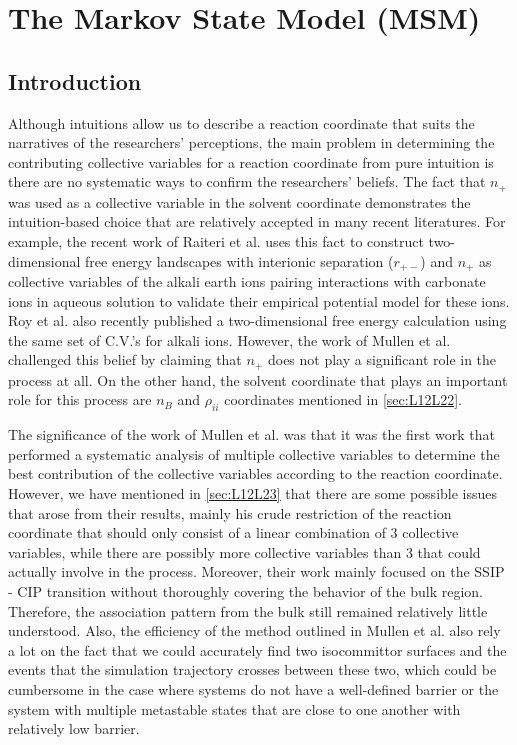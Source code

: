 \chapter{The Markov State Model (MSM)}

\section{Introduction}

\begin{spacing}{2.0}

    Although intuitions allow us to describe a reaction coordinate that suits the narratives of the researchers' perceptions, the main problem in 
    determining the contributing collective variables for a reaction coordinate from pure intuition is there are no systematic ways to confirm the 
    researchers' beliefs. The fact that $n_+$ was used as a collective variable in the solvent coordinate demonstrates the intuition-based choice 
    that are relatively accepted in many recent literatures. For example, the recent work of Raiteri et al. uses this fact to construct 
    two-dimensional free energy landscapes with interionic separation ($r_{+-}$) and $n_+$ as collective variables of the alkali earth ions pairing 
    interactions with carbonate ions in aqueous solution to validate their empirical potential model for these ions. \cite{P-JPhysChemC-2015-v43-Raiteri} 
    Roy et al. also recently published a two-dimensional free energy calculation using the same set of C.V.'s for alkali ions. 
    \cite{P-JPhysChemC-2016-v120-Roy, P-JCTC-2017-v13-Roy} However, the work of Mullen et al. 
    challenged this belief by claiming that $n_+$  does not play a significant role in the process at all. On the other hand, the solvent coordinate 
    that plays an important role for this process are $n_B$ and $\rho_{ii}$ coordinates mentioned in \ref{sec:L12L22}. \cite{P-JCTC-2014-v10-Mullen}

    The significance of the work of Mullen et al. was that it was the first work that performed a systematic analysis of multiple collective variables 
    to determine the best contribution of the collective variables according to the reaction coordinate. However, we have mentioned in \ref{sec:L12L23} 
    that there are some possible issues that arose from their results, mainly his crude restriction of the reaction coordinate that should only 
    consist of a linear combination of 3 collective variables, while there are possibly more collective variables than 3 that could actually involve 
    in the process. Moreover, their work mainly focused on the SSIP - CIP transition without thoroughly covering the behavior of the bulk region. 
    Therefore, the association pattern from the bulk still remained relatively little understood. Also, the efficiency of the method outlined in 
    Mullen et al. also rely a lot on the fact that we could accurately find two isocommittor surfaces and the events that the simulation trajectory 
    crosses between these two, which could be cumbersome in the case where systems do not have a well-defined barrier or the system with multiple 
    metastable states that are close to one another with relatively low barrier.


\end{spacing}

